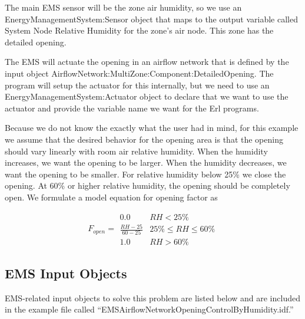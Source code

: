 The main EMS sensor will be the zone air humidity, so we use an EnergyManagementSystem:Sensor object that maps to the output variable called System Node Relative Humidity for the zone's air node. This zone has the detailed opening.

The EMS will actuate the opening in an airflow network that is defined by the input object AirflowNetwork:MultiZone:Component:DetailedOpening. The program will setup the actuator for this internally, but we need to use an EnergyManagementSystem:Actuator object to declare that we want to use the actuator and provide the variable name we want for the Erl programs.

Because we do not know the exactly what the user had in mind, for this example we assume that the desired behavior for the opening area is that the opening should vary linearly with room air relative humidity. When the humidity increases, we want the opening to be larger. When the humidity decreases, we want the opening to be smaller. For relative humidity below 25\% we close the opening. At 60\% or higher relative humidity, the opening should be completely open. We formulate a model equation for opening factor as

\begin{equation}
F_{open} = \begin{array}{ll}
    0.0 & RH < 25\% \\
    \frac{RH-25}{60-25} & 25\% \leq RH \leq 60\% \\
    1.0 & RH > 60\%  
  \end{array}
\end{equation}

\subsection{EMS Input Objects}\label{ems-input-objects-005}

EMS-related input objects to solve this problem are listed below and are included in the example file called ``EMSAirflowNetworkOpeningControlByHumidity.idf.''

